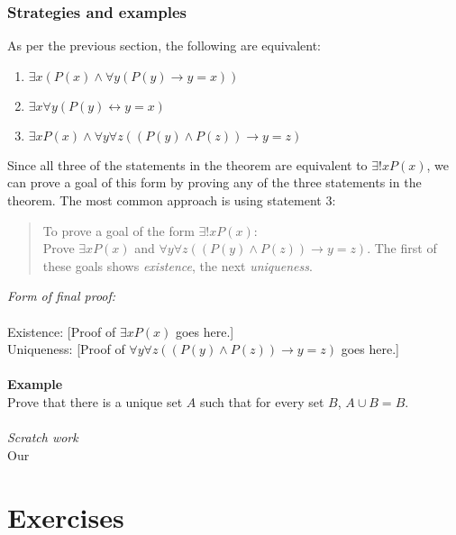 \documentclass{report}
\theoremstyle{definition}
\begin{document}
\subsection{Strategies and examples}
As per the previous section, the following are equivalent:
\begin{enumerate}
\item$\exists x(P(x)\land\forall y(P(y)\to y=x))$
\item$\exists x\forall y(P(y)\leftrightarrow y=x)$
\item$\exists xP(x)\land\forall y\forall z((P(y)\land P(z))\to y=z)$ 
\end{enumerate}
Since all three of the statements in the theorem are equivalent to $\exists!xP(x)$, we can prove a goal of this form by proving any of the three statements in the theorem. 
The most common approach is using statement 3:
\begin{quote}
To prove a goal of the form $\exists!xP(x)$:\\
Prove $\exists xP(x)$ and $\forall y\forall z((P(y)\land P(z))\to y=z)$. The first of these goals shows \textit{existence}, the next \textit{uniqueness}.
\end{quote}
\textit{Form of final proof:}\\
\vspace{1mm}\\
\indent Existence: [Proof of $\exists xP(x)$ goes here.]\\
\indent Uniqueness: [Proof of $\forall y\forall z((P(y)\land P(z))\to y=z)$ goes here.]\\
\vspace{1mm}\\
\textbf{Example}\\
Prove that there is a unique set $A$ such that for every set $B$, $A\cup B=B$.\\
\vspace{1mm}\\
\textit{Scratch work}\\
Our

















\appendix
\chapter{Exercises}
\end{document}
